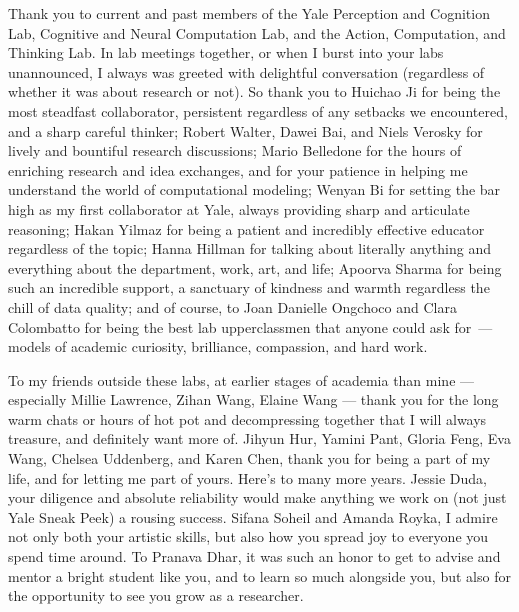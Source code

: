 Thank you to current and past members of the Yale Perception and Cognition Lab, Cognitive and Neural Computation Lab, and the Action, Computation, and Thinking Lab. In lab meetings together, or when I burst into your labs unannounced, I always was greeted with delightful conversation (regardless of whether it was about research or not).  So thank you to Huichao Ji for being the most steadfast collaborator, persistent regardless of any setbacks we encountered, and a sharp careful thinker; Robert Walter, Dawei Bai, and Niels Verosky for lively and bountiful research discussions; Mario Belledone for the hours of enriching research and idea exchanges, and for your patience in helping me understand the world of computational modeling; Wenyan Bi for setting the bar high as my first collaborator at Yale, always providing sharp and articulate reasoning; Hakan Yilmaz for being a patient and incredibly effective educator regardless of the topic; Hanna Hillman for talking about literally anything and everything about the department, work, art, and life; Apoorva Sharma for being such an incredible support, a sanctuary of kindness and warmth regardless the chill of data quality; and of course, to Joan Danielle Ongchoco and Clara Colombatto for being the best lab upperclassmen that anyone could ask for~--- models of academic curiosity, brilliance, compassion, and hard work. 

To my friends outside these labs, at earlier stages of academia than mine --- especially Millie Lawrence, Zihan Wang, Elaine Wang --- thank you for the long warm chats or hours of hot pot and decompressing together that I will always treasure, and definitely want more of. Jihyun Hur, Yamini Pant, Gloria Feng, Eva Wang, Chelsea Uddenberg, and Karen Chen, thank you for being a part of my life, and for letting me part of yours. Here's to many more years. Jessie Duda, your diligence and absolute reliability would make anything we work on (not just Yale Sneak Peek) a rousing success. Sifana Soheil and Amanda Royka, I admire not only both your artistic skills, but also how you spread joy to everyone you spend time around. To Pranava Dhar, it was such an honor to get to advise and mentor a bright student like you, and to learn so much alongside you, but also for the opportunity to see you grow as a researcher.


